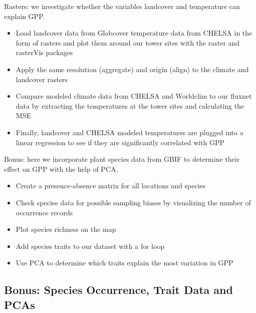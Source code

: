 \documentclass[
]{book}
\providecommand{\tightlist}{%
  \setlength{\itemsep}{0pt}\setlength{\parskip}{0pt}}
\begin{document}
Rasters: we investigate whether the variables landcover and temperature can explain GPP.

\begin{itemize}
\tightlist
\item
  Load landcover data from Globcover temperature data from CHELSA in the form of rasters and plot them around our tower sites with the raster and rasterVis packages
\item
  Apply the same resolution (aggregate) and origin (align) to the climate and landcover rasters
\item
  Compare modeled climate data from CHELSA and Worldclim to our fluxnet data by extracting the temperatures at the tower sites and calculating the MSE
\item
  Finally, landcover and CHELSA modeled temperatures are plugged into a linear regression to see if they are significantly correlated with GPP
\end{itemize}

Bonus: here we incorporate plant species data from GBIF to determine their effect on GPP with the help of PCA.

\begin{itemize}
\tightlist
\item
  Create a presence-absence matrix for all locations and species
\item
  Check species data for possible sampling biases by visualizing the number of occurrence records
\item
  Plot species richness on the map
\item
  Add species traits to our dataset with a for loop
\item
  Use PCA to determine which traits explain the most variation in GPP
\end{itemize}

\hypertarget{bonus-species-occurrence-trait-data-and-pcas}{%
\subsection{Bonus: Species Occurrence, Trait Data and PCAs}\label{bonus-species-occurrence-trait-data-and-pcas}}
\end{document}
